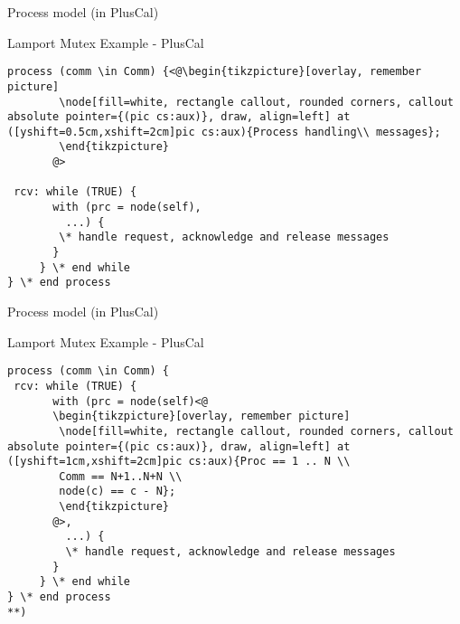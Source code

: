 \documentclass{beamer}
\begin{document}
\begin{frame}[fragile]{Process model (in PlusCal)}
        \begin{exampleblock}{Lamport Mutex Example - PlusCal}
        \begin{lstlisting}[language=pluscal, frame = none, numbers = none]
process (comm \in Comm) {<@\begin{tikzpicture}[overlay, remember picture]
        \node[fill=white, rectangle callout, rounded corners, callout absolute pointer={(pic cs:aux)}, draw, align=left] at ([yshift=0.5cm,xshift=2cm]pic cs:aux){Process handling\\ messages};
        \end{tikzpicture}
       @>
                    
 rcv: while (TRUE) {
       with (prc = node(self),
         ...) {
        \* handle request, acknowledge and release messages
       }
     } \* end while
} \* end process
\end{lstlisting}
\end{exampleblock}
\end{frame}

\begin{frame}[fragile]{Process model (in PlusCal)}
\begin{exampleblock}{Lamport Mutex Example - PlusCal}
        \begin{lstlisting}[language=pluscal, frame = none, numbers = none]
process (comm \in Comm) {
 rcv: while (TRUE) {
       with (prc = node(self)<@
       \begin{tikzpicture}[overlay, remember picture]
        \node[fill=white, rectangle callout, rounded corners, callout absolute pointer={(pic cs:aux)}, draw, align=left] at ([yshift=1cm,xshift=2cm]pic cs:aux){Proc == 1 .. N \\
        Comm == N+1..N+N \\
        node(c) == c - N};
        \end{tikzpicture}
       @>,
         ...) {
         \* handle request, acknowledge and release messages
       }
     } \* end while
} \* end process
**)
\end{lstlisting}
\end{exampleblock}
\end{frame}
\end{document}
